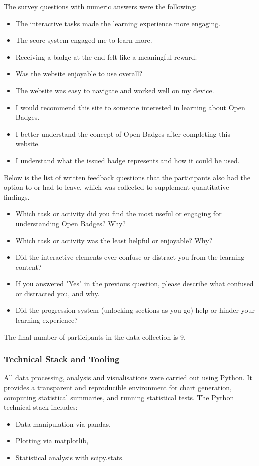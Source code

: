 The survey questions with numeric answers were the following:

\begin{itemize}
        \item The interactive tasks made the learning experience more engaging.
        \item The score system engaged me to learn more.
        \item Receiving a badge at the end felt like a meaningful reward.
        \item Was the website enjoyable to use overall?
        \item The website was easy to navigate and worked well on my device.
        \item I would recommend this site to someone interested in learning about Open Badges.
        \item I better understand the concept of Open Badges after completing this website.
        \item I understand what the issued badge represents and how it could be used.
\end{itemize}

Below is the list of written feedback questions that the participants also had the option to or had to leave, which was collected to supplement quantitative findings.
\begin{itemize}
        \item Which task or activity did you find the most useful or engaging for understanding Open Badges? Why?
        \item Which task or activity was the least helpful or enjoyable? Why?
        \item Did the interactive elements ever confuse or distract you from the learning content?
        \item If you answered "Yes" in the previous question, please describe what confused or distracted you, and why.
        \item Did the progression system (unlocking sections as you go) help or hinder your learning experience?
\end{itemize}

The final number of participants in the data collection is 9.

\subsubsection{Technical Stack and Tooling}

All data processing, analysis and visualisations were carried out using Python. 
It provides a transparent and reproducible environment for chart generation, computing statistical summaries, and running statistical tests. 
The Python technical stack includes:
\begin{itemize}
        \item Data manipulation via pandas,
        \item Plotting via matplotlib,
        \item Statistical analysis with scipy.stats.
\end{itemize}

